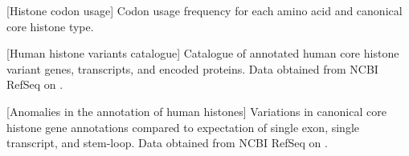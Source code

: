   \newpage
  \newpage
  [Histone codon usage]{%
    Codon usage frequency for each amino acid
    and canonical core histone type.
  }
  \label{tab:histone-gene-codonusage}
  

  \newpage
  [Human histone variants catalogue]{%
    Catalogue of annotated human core histone variant genes, transcripts,
    and encoded proteins.
    Data obtained from NCBI RefSeq \citep{OLearyRefseq2016} on
    \SequencesDate{}.
  }
  \label{tab:variant-catalogue}
  

  \newpage
  \begin{center}
    [Anomalies in the annotation of human histones]{
        Variations in canonical core histone gene annotations
        compared to expectation of single exon, single transcript, and stem-loop.
        Data obtained from NCBI RefSeq \citep{OLearyRefseq2016} on
        \SequencesDate{}.
    }
    \label{tab:curation-anomalies}
    \begin{itemize}
    
    \end{itemize}
  \end{center}
